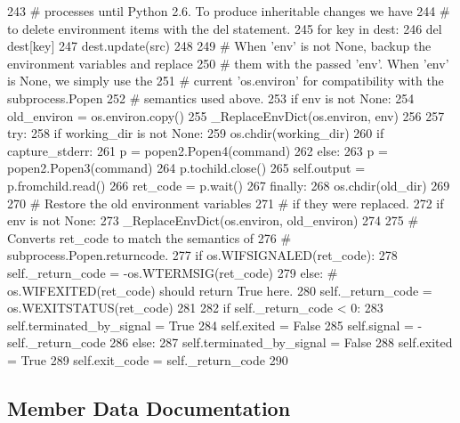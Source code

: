 \begin{DoxyCode}
243         # processes until Python 2.6. To produce inheritable changes we have
244         # to delete environment items with the del statement.
245         for key in dest:
246           del dest[key]
247         dest.update(src)
248 
249       # When 'env' is not None, backup the environment variables and replace
250       # them with the passed 'env'. When 'env' is None, we simply use the
251       # current 'os.environ' for compatibility with the subprocess.Popen
252       # semantics used above.
253       if env is not None:
254         old_environ = os.environ.copy()
255         _ReplaceEnvDict(os.environ, env)
256 
257       try:
258         if working_dir is not None:
259           os.chdir(working_dir)
260         if capture_stderr:
261           p = popen2.Popen4(command)
262         else:
263           p = popen2.Popen3(command)
264         p.tochild.close()
265         self.output = p.fromchild.read()
266         ret_code = p.wait()
267       finally:
268         os.chdir(old_dir)
269 
270         # Restore the old environment variables
271         # if they were replaced.
272         if env is not None:
273           _ReplaceEnvDict(os.environ, old_environ)
274 
275       # Converts ret_code to match the semantics of
276       # subprocess.Popen.returncode.
277       if os.WIFSIGNALED(ret_code):
278         self._return_code = -os.WTERMSIG(ret_code)
279       else:  # os.WIFEXITED(ret_code) should return True here.
280         self._return_code = os.WEXITSTATUS(ret_code)
281 
282     if self._return_code < 0:
283       self.terminated_by_signal = True
284       self.exited = False
285       self.signal = -self._return_code
286     else:
287       self.terminated_by_signal = False
288       self.exited = True
289       self.exit_code = self._return_code
290 

\end{DoxyCode}


\subsection{\-Member \-Data \-Documentation}
\hypertarget{classgtest__test__utils_1_1Subprocess_aae387b0ebf30b42cfeceddf86301a31e}{
\subsubsection[{\-\_\-return\-\_\-code}]{}}\label{d0/d1b/classgtest__test__utils_1_1Subprocess_aae387b0ebf30b42cfeceddf86301a31e}


